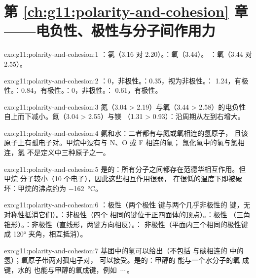 \section*{第 \ref{ch:g11:polarity-and-cohesion} 章——电负性、极性与分子间作用力}

\begin{solution}{exo:g11:polarity-and-cohesion:1}
：氯（3.16 对 2.20）。：氧（3.44）。
：氧（3.44 对 2.55）。
\end{solution}

\begin{solution}{exo:g11:polarity-and-cohesion:2}
：0，非极性。：0.35，视为非极性。：
1.24，有极性。：0.84，有极性。：0，非极性。：
0.61，有极性。
\end{solution}

\begin{solution}{exo:g11:polarity-and-cohesion:3}
氮（3.04 > 2.19）与氧（3.44 > 2.58）的电负性
自上而下减小。氮（3.04 > 2.55）与镁
（1.31 > 0.93）：沿周期从左到右增大。
\end{solution}

\begin{solution}{exo:g11:polarity-and-cohesion:4}
氨和水：二者都有与氮或氧相连的氢原子，
且该原子上有孤电子对。甲烷中没有与 N、O 或 F 相连的氢；
氯化氢中的氢与氯相连，氯
不是定义中三种原子之一。
\end{solution}

\begin{solution}{exo:g11:polarity-and-cohesion:5}
是的：所有分子之间都存在范德华相互作用。但甲烷
分子较小（10 个电子），因此这些相互作用很弱，
在很低的温度下即被破坏：甲烷的沸点约为
\qty{-162}{\celsius}。
\end{solution}

\begin{solution}{exo:g11:polarity-and-cohesion:6}
：极性（两个极性  键与两个几乎非极性的
 键，无对称性抵消它们）。：非极性（四个
相同的键位于正四面体的顶点）。：极性
（三角锥形）。：非极性（直线形，两键方向相反）。：
非极性（平面内三个相同的极性键成 \ang{120} 夹角，相互抵消）。
\end{solution}

\begin{solution}{exo:g11:polarity-and-cohesion:7}
 基团中的氢可以给出（不包括
与碳相连的  中的氢）；氧原子带两对孤电子对，
可以接受。是的：甲醇的  能与一个水分子的氧
成键，水的  也能与甲醇的氧成键，例如
\,$\cdots$\,。
\end{solution}

